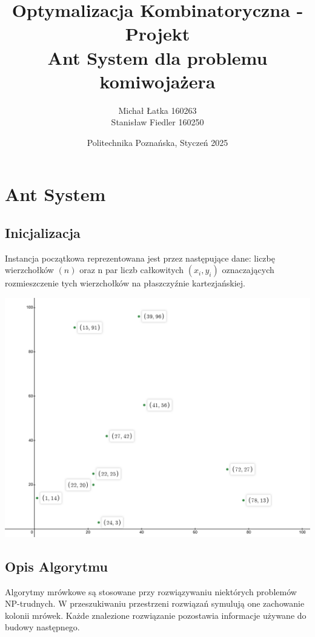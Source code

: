 \documentclass[11pt]{article}
\title{%
        \vspace{-1cm}
       \large Optymalizacja Kombinatoryczna - Projekt \\
       \huge  Ant System dla problemu komiwojażera}
\author{Michał Łatka 160263 \\ Stanisław Fiedler 160250}
\date{Politechnika Poznańska, Styczeń 2025}
\begin{document}
\maketitle
\tableofcontents

\section{Ant System}\label{sec:ant_system} %

\subsection{Inicjalizacja}\label{sub:inicjalizacja} %
Instancja początkowa reprezentowana jest przez następujące dane: liczbę wierzchołków $(n)$ oraz n par liczb całkowitych $(x_i, y_i)$ oznaczających rozmieszczenie tych wierzchołków na płaszczyźnie kartezjańskiej.
\begin{center}
	\includegraphics[scale=0.3]{images/init.png}
\end{center}


\subsection{Opis Algorytmu}\label{sub:opis_algorytmu} %
Algorytmy mrówkowe są stosowane przy rozwiązywaniu niektórych problemów NP-trudnych.
W przeszukiwaniu przestrzeni rozwiązań symulują one zachowanie kolonii mrówek.
Każde znalezione rozwiązanie pozostawia informacje używane do budowy następnego.
\end{document}
